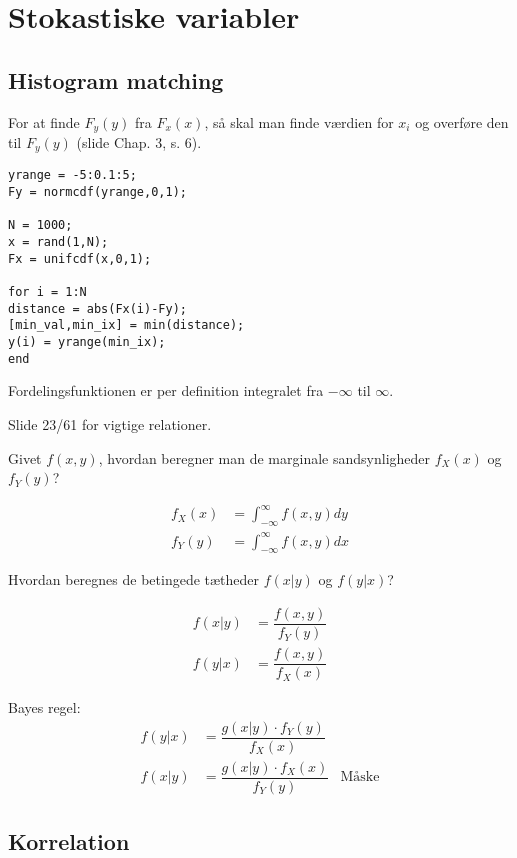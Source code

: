 \documentclass[Main]{subfiles}
\begin{document}
\chapter{Stokastiske variabler}

\section{Histogram matching}
For at finde $F_y(y)$ fra $F_x(x)$, så skal man finde værdien for $x_i$ og overføre den til $F_y(y)$ (slide Chap. 3, s. 6).



\begin{lstlisting}[caption=Uniform fordeling med random tal, style=Code-Matlab, label=lst:uni]
yrange = -5:0.1:5;
Fy = normcdf(yrange,0,1);

N = 1000;
x = rand(1,N);
Fx = unifcdf(x,0,1);

for i = 1:N
distance = abs(Fx(i)-Fy);
[min_val,min_ix] = min(distance);
y(i) = yrange(min_ix);
end

\end{lstlisting}

Fordelingsfunktionen er per definition integralet fra $-\infty$ til $\infty $.

Slide 23/61 for vigtige relationer.

Givet $f(x,y)$, hvordan beregner man de marginale
sandsynligheder $f_X(x)$ og $f_Y(y)$?

\begin{align*}
f_X(x) &= \int_{-\infty}^{\infty} f(x,y) dy\\
f_Y(y) &= \int_{-\infty}^{\infty} f(x,y) dx
\end{align*}

Hvordan beregnes de betingede tætheder $f(x|y)$ og $f(y|x)$?

\begin{align*}
f(x|y) &= \dfrac{f(x,y)}{f_Y(y)}\\
f(y|x) &= \dfrac{f(x,y)}{f_X(x)}
\end{align*}

Bayes regel:
\begin{align*}
f(y|x) &= \dfrac{g(x|y) \cdot f_Y(y)}{f_X(x)}\\
f(x|y) &= \dfrac{g(x|y) \cdot f_X(x)}{f_Y(y)} & \text{Måske}
\end{align*} 


\section{Korrelation}
\end{document}
